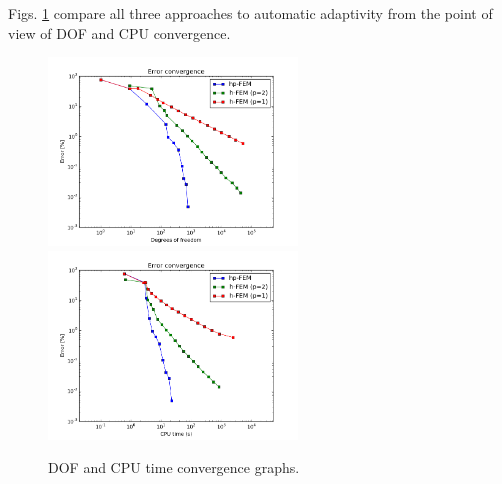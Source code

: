 Figs. \ref{fig:nist-1-conv} compare all
three approaches to automatic adaptivity  from the point
of view of DOF and CPU convergence.

\begin{figure}[!ht]
\centering
\includegraphics[height=5cm]{nist/nist-1/conv_dof_aniso.png}\ \
\includegraphics[height=5cm]{nist/nist-1/conv_cpu_aniso.png}
\vspace{-2mm}
\caption{DOF and CPU time convergence graphs.}
\label{fig:nist-1-conv}
\end{figure}
